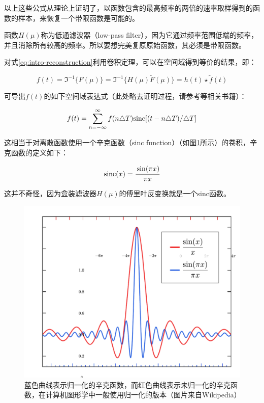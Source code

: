 \noindent 以上这些公式从理论上证明了，以函数包含的最高频率的两倍的速率取样得到的函数的样本，来恢复一个带限函数是可能的。

函数$H(\mu)$称为低通滤波器（low-pass filter），因为它通过频率范围低端的频率，并且消除所有较高的频率。所以要想完美复原原始函数，其必须是带限函数。

对式\ref{eq:intro-reconstruction}利用卷积定理，可以在空间域得到等价的结果，即：

\begin{equation}
	f(t)=\Im^{-1}\{F(\mu)\}=\Im^{-1}\{H(\mu)\tilde{F}(\mu) \}=h(t)\star\tilde{f}(t)
\end{equation}

\noindent 可导出$f(t)$的如下空间域表达式（此处略去证明过程，请参考\cite{b:DigitalImageProcessing}等相关书籍）：

\begin{equation}\label{eq:intro-reconstruction-1}
	f(t)=\sum^{\infty}_{n=-\infty}f(n\triangle T) {\rm sinc}[(t-n\triangle T)/\triangle T]
\end{equation}

\noindent 这相当于对离散函数使用一个辛克函数（sinc function）（如图\ref{f:intro-sinc}所示）的卷积，辛克函数的定义如下：

\begin{equation}
	{\rm sinc}(x)= \cfrac{\sin (\pi x)}{\pi x}
\end{equation}

\noindent 这并不奇怪，因为盒装滤波器$H(\mu)$的傅里叶反变换就是一个sinc函数。

\begin{figure}
\sidecaption
	\includegraphics[width=.65\textwidth]{figures/intro/sinc}
	\caption{蓝色曲线表示归一化的辛克函数，而红色曲线表示未归一化的辛克函数，在计算机图形学中一般使用归一化的版本（图片来自Wikipedia）}
	\label{f:intro-sinc}
\end{figure}

